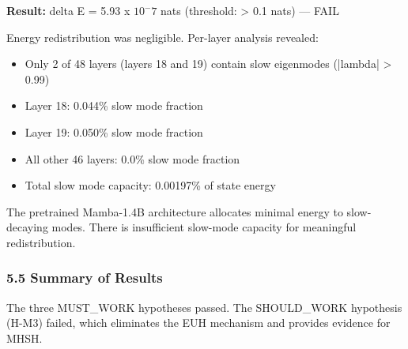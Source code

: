 \textbf{Result:} delta E = 5.93 x $10^-7$ nats (threshold: > 0.1 nats) --- FAIL

Energy redistribution was negligible. Per-layer analysis revealed:

\begin{itemize}
\item Only 2 of 48 layers (layers 18 and 19) contain slow eigenmodes (|lambda| > 0.99)
\item Layer 18: 0.044\% slow mode fraction
\item Layer 19: 0.050\% slow mode fraction
\item All other 46 layers: 0.0\% slow mode fraction
\item Total slow mode capacity: 0.00197\% of state energy
\end{itemize}

The pretrained Mamba-1.4B architecture allocates minimal energy to slow-decaying modes. There is insufficient slow-mode capacity for meaningful redistribution.

\subsubsection{5.5 Summary of Results}

\begin{table}[htbp]
\centering
{}
\end{table}

The three MUST\_WORK hypotheses passed. The SHOULD\_WORK hypothesis (H-M3) failed, which eliminates the EUH mechanism and provides evidence for MHSH.
